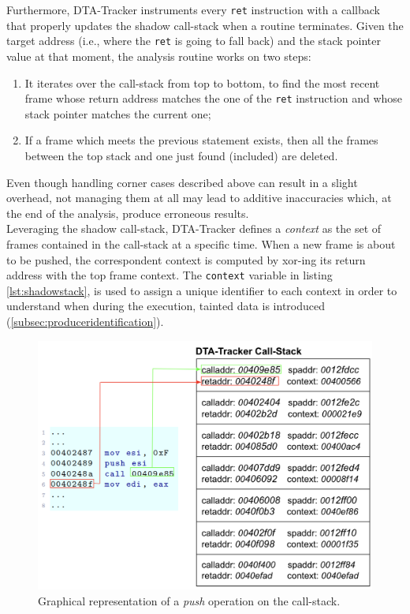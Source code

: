 \documentclass[LaM,binding=0.6cm]{sapthesis}
\begin{document}
Furthermore, DTA-Tracker instruments every \texttt{ret} instruction with a callback that properly updates the shadow call-stack when a routine terminates. Given the target address (i.e., where the \texttt{ret} is going to fall back) and the stack pointer value at that moment, the analysis routine works on two steps:
\begin{enumerate}
\item It iterates over the call-stack from top to bottom, to find the most recent frame whose return address matches the one of the \texttt{ret} instruction and whose stack pointer matches the current one;
\item If a frame which meets the previous statement exists, then all the frames between the top stack and one just found (included) are deleted. 
\end{enumerate}
Even though handling corner cases described above can result in a slight overhead, not managing them at all may lead to additive inaccuracies which, at the end of the analysis, produce erroneous results.\\

Leveraging the shadow call-stack, DTA-Tracker defines a \textit{context} as the set of frames contained in the call-stack at a specific time. When a new frame is about to be pushed, the correspondent context is computed by xor-ing its return address with the top frame context. The \texttt{context} variable in listing \ref{lst:shadowstack}, is used to assign a unique identifier to each context in order to understand when during the execution, tainted data is introduced (\autoref{subsec:produceridentification}).

\begin{figure}[h!]
\centering
\includegraphics[scale=.5]{images/dtatracker2}
\caption{Graphical representation of a \textit{push} operation on the call-stack.}
\end{figure}
\newpage
\end{document}
